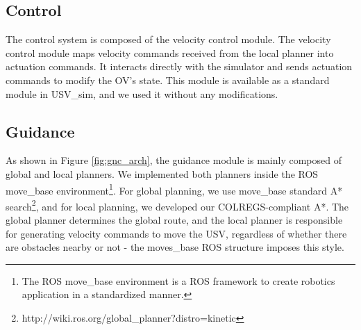     
    \subsection{Control}
    \label{sec:chap4_control}
    
        The control system is composed of the velocity control module. The velocity control module maps velocity commands received from the local planner into actuation commands. It interacts directly with the simulator and sends actuation commands to modify the \ac{OV}'s state.  This module is available as a standard module in USV\_sim, and we used it without any modifications.
        
    \subsection{Guidance}
    \label{sec:chap4_guidance}

        As shown in Figure \ref{fig:gnc_arch}, the guidance module is mainly composed of global and local planners. We implemented both planners inside the ROS move\_base environment\footnote{The ROS move\_base environment is a ROS framework to create robotics application in a standardized manner.}. For global planning, we use move\_base standard A* search\footnote{http://wiki.ros.org/global\_planner?distro=kinetic}, and for local planning, we developed our \ac{COLREGS}-compliant A*. The global planner determines the global route, and the local planner is responsible for generating velocity commands to move the \ac{USV}, regardless of whether there are obstacles nearby or not - the moves\_base ROS structure imposes this style. 
        
